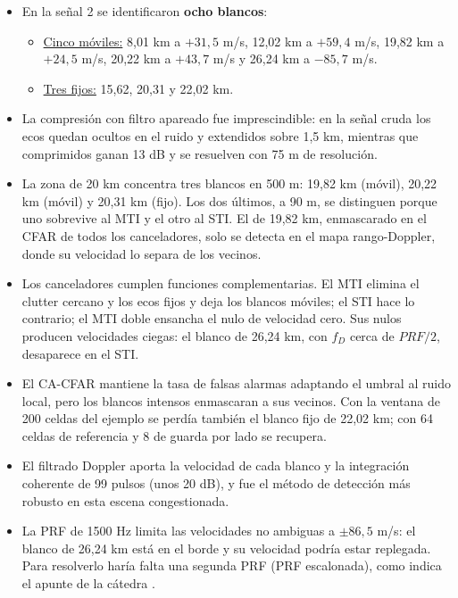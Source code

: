 \begin{itemize}
    \item En la señal 2 se identificaron \textbf{ocho blancos}:
    \begin{itemize}
        \item \underline{Cinco móviles:} 8,01 km a $+31{,}5$ m/s, 12,02 km a $+59{,}4$ m/s, 19,82 km a $+24{,}5$ m/s, 20,22 km a $+43{,}7$ m/s y 26,24 km a $-85{,}7$ m/s.
        \item \underline{Tres fijos:} 15,62, 20,31 y 22,02 km.
    \end{itemize}
    \item La compresión con filtro apareado fue imprescindible: en la señal cruda los ecos quedan ocultos en el ruido y extendidos sobre 1,5 km, mientras que comprimidos ganan 13 dB y se resuelven con 75 m de resolución.
    \item La zona de 20 km concentra tres blancos en 500 m: 19,82 km (móvil), 20,22 km (móvil) y 20,31 km (fijo). Los dos últimos, a 90 m, se distinguen porque uno sobrevive al MTI y el otro al STI. El de 19,82 km, enmascarado en el CFAR de todos los canceladores, solo se detecta en el mapa rango-Doppler, donde su velocidad lo separa de los vecinos.
    \item Los canceladores cumplen funciones complementarias. El MTI elimina el clutter cercano y los ecos fijos y deja los blancos móviles; el STI hace lo contrario; el MTI doble ensancha el nulo de velocidad cero. Sus nulos producen velocidades ciegas: el blanco de 26,24 km, con $f_D$ cerca de $PRF/2$, desaparece en el STI.
    \item El CA-CFAR mantiene la tasa de falsas alarmas adaptando el umbral al ruido local, pero los blancos intensos enmascaran a sus vecinos. Con la ventana de 200 celdas del ejemplo se perdía también el blanco fijo de 22,02 km; con 64 celdas de referencia y 8 de guarda por lado se recupera.
    \item El filtrado Doppler aporta la velocidad de cada blanco y la integración coherente de 99 pulsos (unos 20 dB), y fue el método de detección más robusto en esta escena congestionada.
    \item La PRF de 1500 Hz limita las velocidades no ambiguas a $\pm 86{,}5$ m/s: el blanco de 26,24 km está en el borde y su velocidad podría estar replegada. Para resolverlo haría falta una segunda PRF (PRF escalonada), como indica el apunte de la cátedra \cite{apunte}.
\end{itemize}

\newpage
\printbibliography[heading=bibintoc, title={Bibliografía y Referencias}]

